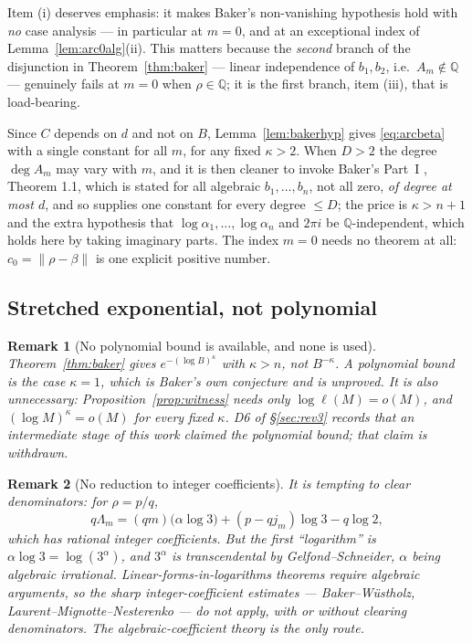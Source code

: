 \documentclass[11pt]{article}
\newtheorem*{remark}{Remark}
\newcommand{\Q}{\mathbb{Q}}
\begin{document}
Item (i) deserves emphasis: it makes Baker's non-vanishing hypothesis hold with \emph{no} case
analysis --- in particular at $m=0$, and at an exceptional index of
Lemma~\ref{lem:arc0alg}(ii). This matters because the \emph{second} branch of the disjunction in
Theorem~\ref{thm:baker} --- linear independence of $b_1,b_2$, i.e.\ $A_m\notin\Q$ --- genuinely
fails at $m=0$ when $\rho\in\Q$; it is the first branch, item (iii), that is load-bearing.

Since $C$ depends on $d$ and not on $B$, Lemma~\ref{lem:bakerhyp} gives \eqref{eq:arcbeta} with a
single constant for all $m$, for any fixed $\kappa>2$. When $D>2$ the degree $\deg A_m$ may vary with
$m$, and it is then cleaner to invoke Baker's Part~I \cite{Baker1966I}, Theorem 1.1, which is stated
for all algebraic $b_1,\ldots,b_n$, not all zero, \emph{of degree at most $d$}, and so supplies one
constant for every degree $\le D$; the price is $\kappa>n+1$ and the extra hypothesis that
$\log\alpha_1,\ldots,\log\alpha_n$ and $2\pi i$ be $\Q$-independent, which holds here by taking
imaginary parts. The index $m=0$ needs no theorem at all: $c_0=\lVert\rho-\beta\rVert$ is one
explicit positive number.

\subsection{Stretched exponential, not polynomial}

\begin{remark}[No polynomial bound is available, and none is used]
\label{rem:nopoly}
Theorem~\ref{thm:baker} gives $e^{-(\log B)^\kappa}$ with $\kappa>n$, not $B^{-\kappa}$. A
polynomial bound is the case $\kappa=1$, which is Baker's own conjecture and is unproved. It is also
unnecessary: Proposition~\ref{prop:witness} needs only $\log\ell(M)=o(M)$, and
$(\log M)^\kappa=o(M)$ for every fixed $\kappa$. D6 of \S\ref{sec:rev3} records that an intermediate
stage of this work claimed the polynomial bound; that claim is withdrawn.
\end{remark}

\begin{remark}[No reduction to integer coefficients]
\label{rem:noreduction}
It is tempting to clear denominators: for $\rho=p/q$,
\[
  q\Lambda_m=(qm)\bigl(\alpha\log3\bigr)+(p-qj_m)\log3-q\log2,
\]
which has rational integer coefficients. But the first ``logarithm'' is
$\alpha\log3=\log(3^\alpha)$, and $3^\alpha$ is \emph{transcendental} by Gelfond--Schneider, $\alpha$
being algebraic irrational. Linear-forms-in-logarithms theorems require algebraic arguments, so the
sharp integer-coefficient estimates --- Baker--W\"ustholz, Laurent--Mignotte--Nesterenko --- do not
apply, with or without clearing denominators. The algebraic-coefficient theory is the only route.
\end{remark}
\end{document}

